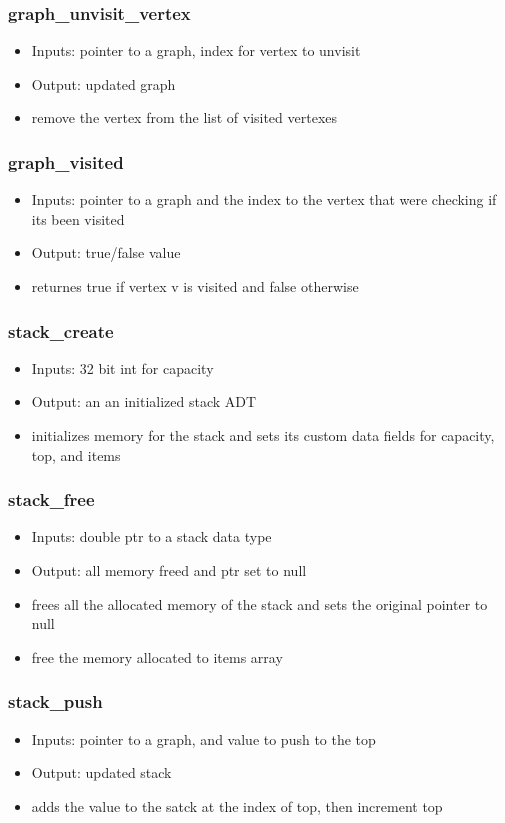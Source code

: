 \documentclass{article}
\begin{document}
\subsubsection{graph\_unvisit\_vertex}
\begin{itemize}
    \item Inputs: pointer to a graph, index for vertex to unvisit
    \item Output: updated graph
    \item remove the vertex from the list of visited vertexes 
\end{itemize}
\subsubsection{graph\_visited}
\begin{itemize}
    \item Inputs: pointer to a graph and the index to the vertex that were checking if its been visited
    \item Output: true/false value
    \item returnes true if vertex v is visited and false otherwise 
\end{itemize}
\subsubsection{stack\_create}
\begin{itemize}
    \item Inputs: 32 bit int for capacity
    \item Output: an an initialized stack ADT
    \item initializes memory for the stack and sets its custom data fields for capacity, top, and items 
\end{itemize}
\subsubsection{stack\_free}
\begin{itemize}
    \item Inputs: double ptr to a stack data type
    \item Output: all memory freed and ptr set to null
    \item frees all the allocated memory of the stack and sets the original pointer to null
    \item free the memory allocated to items array 
\end{itemize}
\subsubsection{stack\_push}
\begin{itemize}
    \item Inputs: pointer to a graph, and value to push to the top 
    \item Output: updated stack  
    \item adds the value to the satck at the index of top, then increment top 
\end{itemize}
\end{document}
